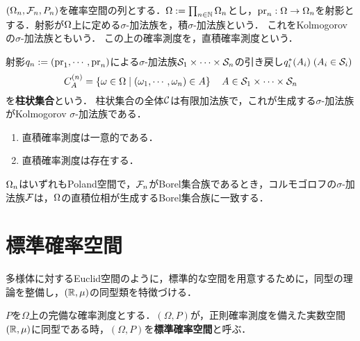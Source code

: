 \documentclass[uplatex,dvipdfmx]{jsreport}
\begin{document}
\begin{definition}
    $(\Omega_n,\mathcal{F}_n,P_n)$を確率空間の列とする．$\Omega:=\prod_{n\in\mathbb{N}}\Omega_n$とし，$\mathrm{pr}_n:\Omega\to\Omega_n$を射影とする．射影が$\Omega$上に定める$\sigma$-加法族を，積$\sigma$-加法族という．
    これをKolmogorovの$\sigma$-加法族ともいう．
    この上の確率測度を，直積確率測度という．
\end{definition}
\begin{remark}\label{remark-cylinder-sets}
    射影$q_n:=(\mathrm{pr}_1,\cdots,\mathrm{pr}_n)$による$\sigma$-加法族$\mathcal{S}_1\times\cdots\times\mathcal{S}_n$の引き戻し$q_i^*(A_i)\;(A_i\in\mathcal{S}_i)$
    \[C_A^{(n)}=\left\{\omega\in\Omega\mid(\omega_1,\cdots,\omega_n)\in A\right\}\quad A\in\mathcal{S}_1\times\cdots\times\mathcal{S}_n\]
    を\textbf{柱状集合}という．
    柱状集合の全体$\mathcal{C}$は有限加法族で，これが生成する$\sigma$-加法族がKolmogorov $\sigma$-加法族である．
\end{remark}

\begin{lemma}\mbox{}
    \begin{enumerate}
        \item 直積確率測度は一意的である．
        \item 直積確率測度は存在する．
    \end{enumerate}
\end{lemma}

\begin{theorem}\label{thm-product-sigma-algebra}
    $\Omega_n$はいずれもPoland空間で，$\mathcal{F}_n$がBorel集合族であるとき，コルモゴロフの$\sigma$-加法族$\mathcal{F}$は，$\Omega$の直積位相が生成するBorel集合族に一致する．
\end{theorem}

\section{標準確率空間}

\begin{tcolorbox}[colframe=ForestGreen, colback=ForestGreen!10!white,breakable,colbacktitle=ForestGreen!40!white,coltitle=black,fonttitle=\bfseries\sffamily,
title=]
    多様体に対するEuclid空間のように，標準的な空間を用意するために，同型の理論を整備し，$(\mathbb{R},\mu)$の同型類を特徴づける．
\end{tcolorbox}

\begin{definition}\label{def-canonical-measure}
    $P$を$\Omega$上の完備な確率測度とする．$(\Omega,P)$が，正則確率測度を備えた実数空間$(\mathbb{R},\mu)$に同型である時，$(\Omega,P)$を\textbf{標準確率空間}と呼ぶ．
\end{definition}
\end{document}
